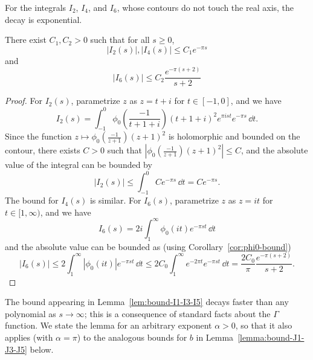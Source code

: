 For the integrals $I_2$, $I_4$, and $I_6$, whose contours do not touch the real axis, the decay is exponential.
\begin{lemma}\label{lem:bound-I2-I4-I6}\leanok
    There exist $C_1, C_2 > 0$ such that for all $s \geq 0$,
    \begin{equation}
        |I_2(s)|, |I_4(s)| \leq C_1 e^{-\pi s}
    \end{equation}
    and
    \begin{equation}
        |I_6(s)| \leq C_2 \frac{e^{-\pi(s + 2)}}{s + 2}
    \end{equation}
\end{lemma}
\begin{proof}
    For $I_2(s)$, parametrize $z$ as $z = t + i$ for $t \in [-1,0]$, and we have
    $$
        I_2(s) = \int_{-1}^0 \phi_0\left(\frac{-1}{t + 1 + i}\right) (t + 1 + i)^2 e^{\pi i s t} e^{-\pi s} \, \dd t.
    $$
    Since the function $z \mapsto \phi_0\left(\frac{-1}{z+1}\right) (z+1)^2$ is holomorphic and bounded on the contour,
    there exists $C > 0$ such that $|\phi_0\left(\frac{-1}{z+1}\right) (z + 1)^2| \leq C$, and the absolute value of the integral can be bounded by
    $$
        |I_2(s)| \le \int_{-1}^{0} C e^{-\pi s} \, \dd t = C e^{-\pi s}.
    $$
    The bound for $I_4(s)$ is similar.
    For $I_6(s)$, parametrize $z$ as $z = i t$ for $t \in [1, \infty)$, and we have
    $$
        I_6(s) = 2 i \int_1^{\infty} \phi_0(i t) e^{-\pi s t} \, \dd t
    $$
    and the absolute value can be bounded as (using Corollary~\ref{cor:phi0-bound})
    $$
        |I_6(s)| \leq 2 \int_1^{\infty} |\phi_0(i t)| e^{-\pi s t} \, \dd t \leq 2C_0 \int_1^{\infty} e^{-2\pi t} e^{-\pi s t} \, \dd t = \frac{2C_0}{\pi} \frac{e^{-\pi (s + 2)}}{s + 2}.
    $$
\end{proof}

The bound appearing in Lemma~\ref{lem:bound-I1-I3-I5} decays faster than any polynomial as $s \to \infty$; this is a consequence of standard facts about the $\Gamma$ function. We state the lemma for an arbitrary exponent $\alpha > 0$, so that it also applies (with $\alpha = \pi$) to the analogous bounds for $b$ in Lemma~\ref{lemma:bound-J1-J3-J5} below.

